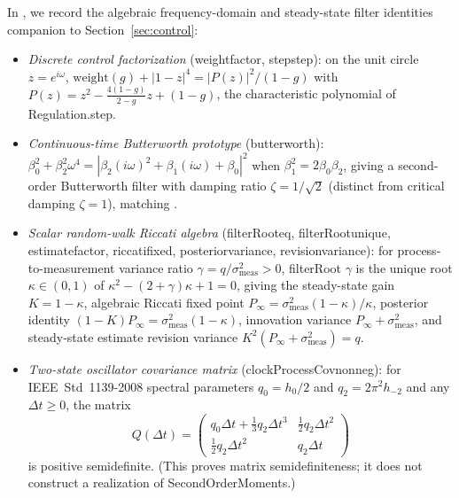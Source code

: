 \documentclass[11pt,a4paper]{article}
\DeclareRobustCommand{\lean}[1]{{\ttfamily\def\_{\textunderscore\allowbreak}#1}}
\theoremstyle{definition}
\begin{document}
In , we record the algebraic
frequency-domain and steady-state filter identities companion to
Section~\ref{sec:control}:
\begin{itemize}
\item \emph{Discrete control factorization} (\lean{weight\_factor},
  \lean{step\_step}): on the unit circle $z = e^{i\omega}$,
  $\mathrm{weight}(g) + |1 - z|^4 = |P(z)|^2 / (1 - g)$ with
  $P(z) = z^2 - \frac{4(1-g)}{2-g} z + (1 - g)$, the characteristic polynomial
  of \lean{Regulation.step}.
\item \emph{Continuous-time Butterworth prototype} (\lean{butterworth}):
  $\beta_0^2 + \beta_2^2\omega^4 = |\beta_2(i\omega)^2 + \beta_1(i\omega) + \beta_0|^2$
  when $\beta_1^2 = 2 \beta_0 \beta_2$, giving a second-order Butterworth filter
  with damping ratio $\zeta = 1/\sqrt{2}$ (distinct from critical damping
  $\zeta = 1$), matching .
\item \emph{Scalar random-walk Riccati algebra} (\lean{filterRoot\_eq},
  \lean{filterRoot\_unique}, \lean{estimate\_factor}, \lean{riccati\_fixed},
  \lean{posterior\_variance}, \lean{revision\_variance}): for process-to-measurement
  variance ratio $\gamma = q / \sigma_{\mathrm{meas}}^2 > 0$, \lean{filterRoot}
  $\gamma$ is the unique root $\kappa \in (0, 1)$ of
  $\kappa^2 - (2 + \gamma)\kappa + 1 = 0$, giving the steady-state gain
  $K = 1 - \kappa$, algebraic Riccati fixed point
  $P_{\infty} = \sigma_{\mathrm{meas}}^2(1 - \kappa)/\kappa$, posterior identity
  $(1 - K)P_{\infty} = \sigma_{\mathrm{meas}}^2(1 - \kappa)$, innovation
  variance $P_{\infty} + \sigma_{\mathrm{meas}}^2$, and steady-state estimate
  revision variance $K^2(P_{\infty} + \sigma_{\mathrm{meas}}^2) = q$.
\item \emph{Two-state oscillator covariance matrix}
  (\lean{clockProcessCov\_nonneg}): for IEEE~Std~1139-2008 spectral parameters
  \cite{ieee1139} $q_0 = h_0/2$ and $q_2 = 2\pi^2 h_{-2}$ and any
  $\Delta t \ge 0$, the matrix
  \[
    Q(\Delta t) =
    \begin{pmatrix}
      q_0 \Delta t + \frac{1}{3} q_2 \Delta t^3 & \frac{1}{2} q_2 \Delta t^2 \\
      \frac{1}{2} q_2 \Delta t^2 & q_2 \Delta t
    \end{pmatrix}
  \]
  is positive semidefinite. (This proves matrix semidefiniteness; it does not
  construct a realization of \lean{SecondOrderMoments}.)
\end{itemize}
\end{document}
